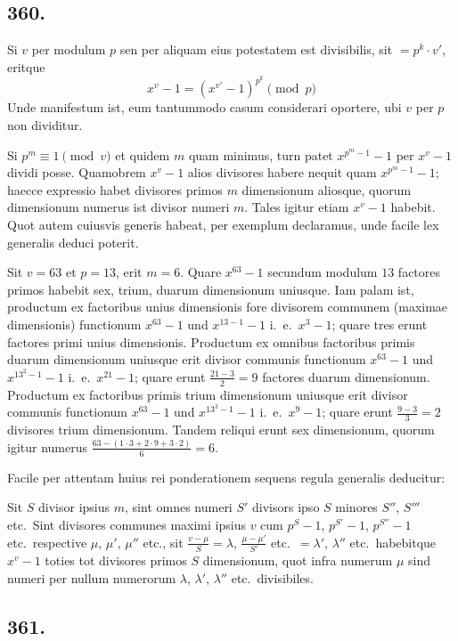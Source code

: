 \documentclass[12pt,a4paper]{article}
\begin{document}
\subsection*{360.}

Si $v$ per modulum $p$ sen per aliquam eius potestatem est divisibilis, sit $=p^k\cdot v'$, eritque
\[
x^v-1 = (x^{v'}-1)^{p^k} \pmod{p}
\]
Unde manifestum ist, eum tantummodo casum considerari oportere, ubi $v$ per $p$ non dividitur.

Si $p^m\equiv 1\pmod{v}$ et quidem $m$ quam minimus, turn patet $x^{p^m-1}-1$ per $x^v-1$ dividi posse. Quamobrem $x^v-1$ alios divisores habere nequit quam $x^{p^m-1}-1$; haecce expressio habet divisores primos $m$ dimensionum aliosque, quorum dimensionum numerus ist divisor numeri $m$. Tales igitur etiam $x^v-1$ habebit. Quot autem cuiusvis generis habeat, per exemplum declaramus, unde facile lex generalis deduci poterit.

Sit $v=63$ et $p=13$, erit $m=6$. Quare $x^{63}-1$ secundum modulum $13$ factores primos habebit sex, trium, duarum dimensionum uniusque. Iam palam ist, productum ex factoribus unius dimensionis fore divisorem communem (maximae dimensionis) functionum $x^{63}-1$ und $x^{13-1}-1$ i.~e.~$x^3-1$; quare tres erunt factores primi unius dimensionis. Productum ex omnibus factoribus primis duarum dimensionum uniusque erit divisor communis functionum $x^{63}-1$ und $x^{13^2-1}-1$ i.~e.~$x^{21}-1$; quare erunt $\frac{21-3}{2}=9$ factores duarum dimensionum. Productum ex factoribus primis trium dimensionum uniusque erit divisor communis functionum $x^{63}-1$ und $x^{13^3-1}-1$ i.~e.~$x^9-1$; quare erunt $\frac{9-3}{3}=2$ divisores trium dimensionum. Tandem reliqui erunt sex dimensionum, quorum igitur numerus $\frac{63-(1\cdot 3+2\cdot 9+3\cdot 2)}{6}=6$.

Facile per attentam huius rei ponderationem sequens regula generalis deducitur:

Sit $S$ divisor ipsius $m$, sint omnes numeri $S'$ divisors ipso $S$ minores $S''$, $S'''$ etc.~Sint divisores communes maximi ipsius $v$ cum $p^S-1$, $p^{S'}-1$, $p^{S''}-1$ etc.~respective $\mu$, $\mu'$, $\mu''$ etc., sit $\frac{v-\mu}{S}=\lambda$, $\frac{\mu-\mu'}{S'}$ etc.~$=\lambda'$, $\lambda''$ etc.~habebitque $x^v-1$ toties tot divisores primos $S$ dimensionum, quot infra numerum $\mu$ sind numeri per nullum numerorum $\lambda$, $\lambda'$, $\lambda''$ etc.~divisibiles.

\subsection*{361.}
\end{document}
